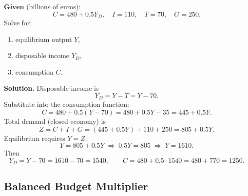 \begin{examplebox}[title={Worked Example (Tutorial 1, Question 1): Equilibrium GDP, disposable income, consumption}]
\textbf{Given} (billions of euros):
\[
C = 480 + 0.5Y_D,\quad I=110,\quad T=70,\quad G=250.
\]
Solve for:
\begin{enumerate}[label=(\alph*)]
\item equilibrium output $Y$,
\item disposable income $Y_D$,
\item consumption $C$.
\end{enumerate}

\textbf{Solution.}
Disposable income is
\[
Y_D = Y - T = Y - 70.
\]
Substitute into the consumption function:
\[
C = 480 + 0.5(Y-70)
  = 480 + 0.5Y - 35
  = 445 + 0.5Y.
\]
Total demand (closed economy) is
\[
Z = C + I + G
  = (445 + 0.5Y) + 110 + 250
  = 805 + 0.5Y.
\]
Equilibrium requires $Y=Z$:
\[
Y = 805 + 0.5Y
\;\Rightarrow\;
0.5Y = 805
\;\Rightarrow\;
Y = 1610.
\]
Then
\[
Y_D = Y - 70 = 1610 - 70 = 1540,
\qquad
C = 480 + 0.5\cdot 1540 = 480 + 770 = 1250.
\]
\end{examplebox}


\newpage
\subsection{Balanced Budget Multiplier}

